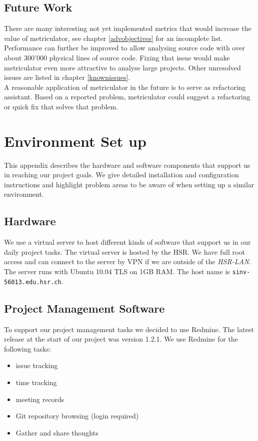 \documentclass[11pt,a4paper,oneside]{scrreprt}
\begin{document}
\section{Future Work}
There are many interesting not yet implemented metrics that would increase the value of metriculator, see chapter \ref{advobjectives} for an incomplete list.\\
Performance can further be improved to allow analysing source code with over about 300'000 physical lines of source code. Fixing that issue would make metriculator even more attractive to analyse large projects. Other unresolved issues are listed in chapter \ref{knownissues}.\\
A reasonable application of metriculator in the future is to serve as refactoring assistant. Based on a reported problem, metriculator could suggest a refactoring or quick fix that solves that problem.

\newpage
\thispagestyle{empty}
\mbox{}
\newpage


\appendix

\chapter{Environment Set up}
This appendix describes the hardware and software components that support us in reaching our project goals. We give detailed installation and configuration instructions and highlight problem areas to be aware of when setting up a similar environment.

\section{Hardware}
We use a virtual server to host different kinds of software that support us in our daily project tasks. The virtual server is hosted by the HSR. We have full root access and can connect to the server by VPN if we are outside of the \textit{HSR-LAN}. The server runs with Ubuntu 10.04 TLS on 1GB RAM. The host name is \texttt{sinv-56013.edu.hsr.ch}.

\section{Project Management Software}
To support our project management tasks we decided to use Redmine. The latest release at the start of our project was version 1.2.1. We use Redmine for the following tasks:
\begin{itemize}
\item issue tracking
\item time tracking
\item meeting records
\item Git repository browsing (login required)
\item Gather and share thoughts
\end{itemize}
\end{document}
